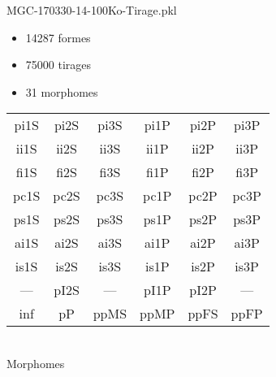 MGC-170330-14-100Ko-Tirage.pkl
\begin{itemize}
\item 14287 formes
\item 75000 tirages
\item 31 morphomes
\end{itemize}
\begin{center}
\begin{tabular}{cccccc}
\hline
\cellcolor{white}pi1S & \cellcolor{orange}pi2S & \cellcolor{orange}pi3S & \cellcolor{white}pi1P & \cellcolor{white}pi2P & \cellcolor{white}pi3P\\
\cellcolor{brown}ii1S & \cellcolor{brown}ii2S & \cellcolor{brown}ii3S & \cellcolor{white}ii1P & \cellcolor{white}ii2P & \cellcolor{brown}ii3P\\
\cellcolor{yellow}fi1S & \cellcolor{lime}fi2S & \cellcolor{lime}fi3S & \cellcolor{green}fi1P & \cellcolor{white}fi2P & \cellcolor{green}fi3P\\
\cellcolor{yellow}pc1S & \cellcolor{yellow}pc2S & \cellcolor{yellow}pc3S & \cellcolor{white}pc1P & \cellcolor{white}pc2P & \cellcolor{yellow}pc3P\\
\cellcolor{teal}ps1S & \cellcolor{teal}ps2S & \cellcolor{teal}ps3S & \cellcolor{white}ps1P & \cellcolor{white}ps2P & \cellcolor{teal}ps3P\\
\cellcolor{white}ai1S & \cellcolor{lightgray}ai2S & \cellcolor{lightgray}ai3S & \cellcolor{white}ai1P & \cellcolor{pink}ai2P & \cellcolor{white}ai3P\\
\cellcolor{pink}is1S & \cellcolor{pink}is2S & \cellcolor{lightgray}is3S & \cellcolor{pink}is1P & \cellcolor{black}is2P & \cellcolor{pink}is3P\\
--- & \cellcolor{white}pI2S & --- & \cellcolor{white}pI1P & \cellcolor{white}pI2P & ---\\
\cellcolor{white}inf & \cellcolor{white}pP & \cellcolor{white}ppMS & \cellcolor{white}ppMP & \cellcolor{white}ppFS & \cellcolor{white}ppFP\\
\hline
\end{tabular}\\
Morphomes
\end{center}
\bigskip

